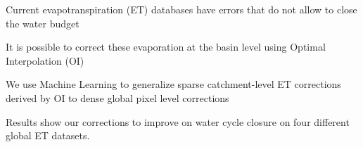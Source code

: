 \documentclass[draft]{agujournal2019}
\begin{document}



\begin{keypoints}
\item Current evapotranspiration (ET) databases have errors that do not allow to close the water budget
\item It is possible to correct these evaporation at the basin level using Optimal Interpolation (OI)
\item We use Machine Learning to generalize sparse catchment-level ET corrections derived by OI to dense global pixel level corrections
\item Results show our corrections to improve on water cycle closure on four different global ET datasets.
\end{keypoints}

%
%

%
%

\end{document}
